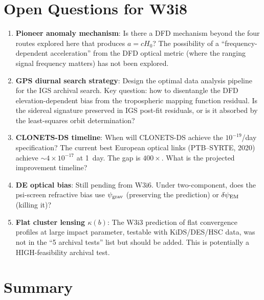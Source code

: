 \documentclass[11pt]{article}
\newcommand{\ee}[1]{\times 10^{#1}}
\newcommand{\psigrav}{\psi_{\rm grav}}
\newcommand{\dpsiEM}{\delta\psi_{\rm EM}}
\newcommand{\Hzero}{H_0}
\begin{document}
\section{Open Questions for W3i8}
\label{sec:open}

\begin{enumerate}
\item \textbf{Pioneer anomaly mechanism}: Is there a DFD mechanism
  beyond the four routes explored here that produces $a = c\Hzero$?
  The possibility of a ``frequency-dependent acceleration'' from
  the DFD optical metric (where the ranging signal frequency matters)
  has not been explored.

\item \textbf{GPS diurnal search strategy}: Design the optimal
  data analysis pipeline for the IGS archival search. Key question:
  how to disentangle the DFD elevation-dependent bias from the
  tropospheric mapping function residual. Is the sidereal signature
  preserved in IGS post-fit residuals, or is it absorbed by the
  least-squares orbit determination?

\item \textbf{CLONETS-DS timeline}: When will CLONETS-DS achieve
  the $10^{-19}$/day specification? The current best European
  optical links (PTB--SYRTE, 2020) achieve $\sim 4\ee{-17}$ at
  1~day. The gap is $400\times$. What is the projected
  improvement timeline?

\item \textbf{DE optical bias}: Still pending from W3i6. Under
  two-component, does the psi-screen refractive bias use
  $\psigrav$ (preserving the prediction) or $\dpsiEM$ (killing it)?

\item \textbf{Flat cluster lensing $\kappa(b)$}: The W3i3 prediction
  of flat convergence profiles at large impact parameter, testable
  with KiDS/DES/HSC data, was not in the ``5 archival tests'' list
  but should be added. This is potentially a HIGH-feasibility archival
  test.
\end{enumerate}

\section{Summary}
\label{sec:summary}
\end{document}
